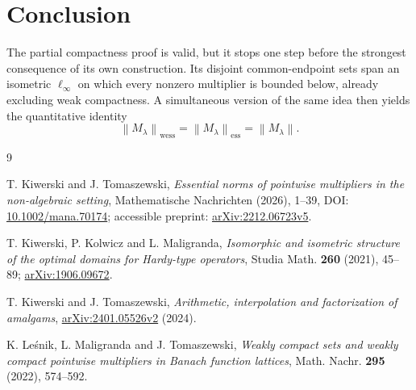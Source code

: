 \documentclass[11pt]{article}
\theoremstyle{remark}
\newcommand{\norm}[1]{\left\lVert #1\right\rVert}
\begin{document}
\section{Conclusion}

The partial compactness proof is valid, but it stops one step before the
strongest consequence of its own construction.  Its disjoint common-endpoint
sets span an isometric $\ell_\infty$ on which every nonzero multiplier is
bounded below, already excluding weak compactness.  A simultaneous
version of the same idea then yields the quantitative identity
\[
 \boxed{\quad
 \norm{M_\lambda}_{\mathrm{wess}}
 =\norm{M_\lambda}_{\mathrm{ess}}
 =\norm{M_\lambda}.
 \quad}
\]

\begin{thebibliography}{9}

T. Kiwerski and J. Tomaszewski,
\emph{Essential norms of pointwise multipliers in the non-algebraic setting},
Mathematische Nachrichten (2026), 1--39,
DOI: \href{https://doi.org/10.1002/mana.70174}{10.1002/mana.70174};
accessible preprint: \href{https://arxiv.org/abs/2212.06723}{arXiv:2212.06723v5}.

T. Kiwerski, P. Kolwicz and L. Maligranda,
\emph{Isomorphic and isometric structure of the optimal domains for
Hardy-type operators},
Studia Math. \textbf{260} (2021), 45--89;
\href{https://arxiv.org/abs/1906.09672}{arXiv:1906.09672}.

T. Kiwerski and J. Tomaszewski,
\emph{Arithmetic, interpolation and factorization of amalgams},
\href{https://arxiv.org/abs/2401.05526}{arXiv:2401.05526v2} (2024).

K. Le\'snik, L. Maligranda and J. Tomaszewski,
\emph{Weakly compact sets and weakly compact pointwise multipliers in Banach
function lattices},
Math. Nachr. \textbf{295} (2022), 574--592.

\end{thebibliography}
\end{document}
